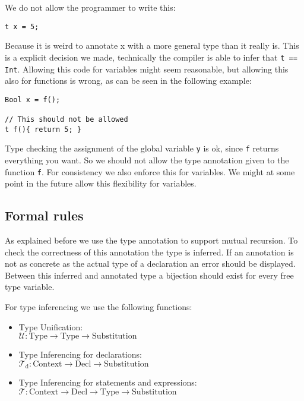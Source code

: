 \documentclass[11pt]{amsart}
\begin{document}
We do not allow the programmer to write this:

\begin{lstlisting}[language=spl]
t x = 5;
\end{lstlisting}

Because it is weird to annotate x with a more general type than it really is. This is a explicit decision we made, technically the compiler is able to infer that \texttt{t == Int}. Allowing this code for variables might seem reasonable, but allowing this also for functions is wrong, as can be seen in the following example:

\begin{lstlisting}[language=spl]
Bool x = f();

// This should not be allowed
t f(){ return 5; }
\end{lstlisting}

Type checking the assignment of the global variable \texttt{y} is ok, since \texttt{f} returns everything you want. So we should not allow the type annotation given to the function \texttt{f}. For consistency we also enforce this for variables. We might at some point in the future allow this flexibility for variables.

\subsection{Formal rules}

\newcommand{\T}{\mathcal{T}}
\newcommand{\U}{\mathcal{U}}
\newcommand{\s}{\ast}
\newcommand{\sn}[1]{\s_{#1}}

As explained before we use the type annotation to support mutual recursion. To check the correctness of this annotation the type is inferred. If an annotation is not as concrete as the actual type of a declaration an error should be displayed. Between this inferred and annotated type a bijection should exist for every free type variable.

For type inferencing we use the following functions:

\begin{itemize}
	\item Type Unification: \\
		$\U \colon \mbox{Type} \rightarrow \mbox{Type} \rightarrow \mbox{Substitution}$
	\item Type Inferencing for declarations: \\
		$\T_{\mbox{d}} \colon \mbox{Context} \rightarrow \mbox{Decl} \rightarrow \mbox{Substitution}$
	\item Type Inferencing for statements and expressions: \\
		$\T \colon \mbox{Context} \rightarrow \mbox{Decl} \rightarrow \mbox{Type} \rightarrow \mbox{Substitution}$
\end{itemize}
\end{document}
